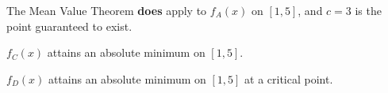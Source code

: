 \documentclass{ximera}
\begin{document}
\begin{exercise}
The Mean Value Theorem \textbf{does} apply to $f_A(x)$ on $[1,5]$, and $c=3$ is the point guaranteed to exist.
\begin{multipleChoice}
\end{multipleChoice}

$f_C(x)$ attains an absolute minimum on $[1,5]$.
\begin{multipleChoice}
\end{multipleChoice}

$f_D(x)$ attains an absolute minimum on $[1,5]$ at a critical point.
\begin{multipleChoice}
\end{multipleChoice}

\end{exercise}
\end{document}
